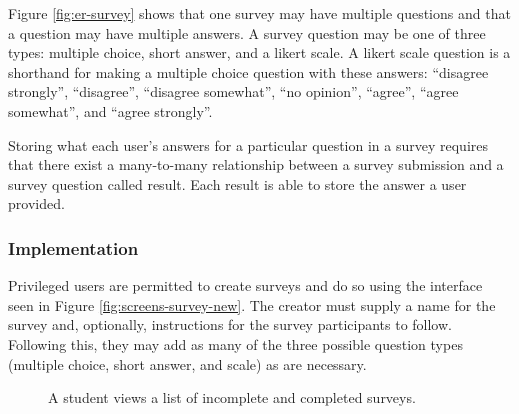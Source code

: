 Figure \ref{fig:er-survey} shows that one survey may have multiple questions and that a question may have multiple answers. A survey question may be one of three types: multiple choice, short answer, and a likert scale. A likert scale question is a shorthand for making a multiple choice question with these answers: ``disagree strongly'', ``disagree'', ``disagree somewhat'', ``no opinion'', ``agree'', ``agree somewhat'', and ``agree strongly''.

Storing what each user's answers for a particular question in a survey requires that there exist a many-to-many relationship between a survey submission and a survey question called result. Each result is able to store the answer a user provided.

\subsubsection{Implementation}
Privileged users are permitted to create surveys and do so using the interface seen in Figure \ref{fig:screens-survey-new}. The creator must supply a name for the survey and, optionally, instructions for the survey participants to follow. Following this, they may add as many of the three possible question types (multiple choice, short answer, and scale) as are necessary.

\begin{figure}[h!]
	\centering
	\caption{A student views a list of incomplete and completed surveys.}
	\label{fig:screens-survey-list}
\end{figure}

